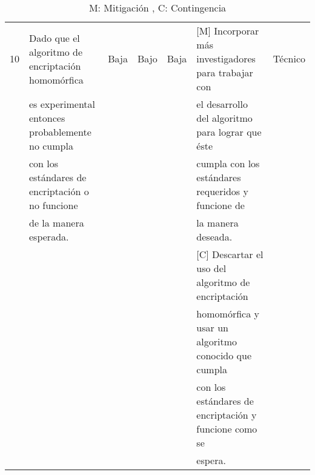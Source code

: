 \begin{landscape}
\begin{table}
\begin{tabular}{| l | l | l | l | l | l | l | }
10 & Dado que el algoritmo de encriptación homomórfica & Baja & Bajo & Baja & [M] Incorporar más investigadores para trabajar con & Técnico\\
  & es experimental entonces probablemente no cumpla  & & & &		el desarrollo del algoritmo para lograr que éste & \\
  & con los estándares de encriptación o no funcione  & & & &		cumpla con los estándares requeridos y funcione de & \\
  & de la manera esperada. 							  & & & & 		la manera deseada. & \\ 
  &&&&																&[C] Descartar el uso del algoritmo de encriptación & \\ 		  &&&&																& homomórfica y usar un algoritmo conocido que cumpla & \\
  &&&&																& con los estándares de encriptación y funcione como se & \\
  &&&&																& espera. &\\ \hline

     \hline
\end{tabular}
\caption{M: Mitigación , C: Contingencia}
\end{table}
\end{landscape}
